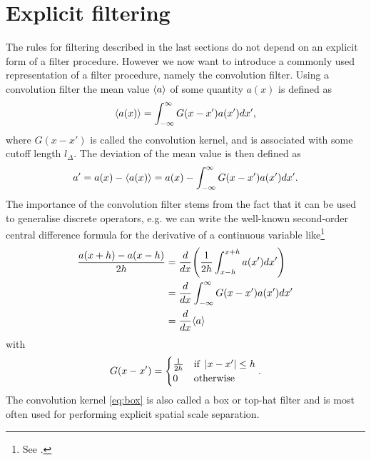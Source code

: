 \section{Explicit filtering}\label{expfil}
The rules for filtering described in the last sections do not depend on an
explicit form of a filter procedure. However we now want to introduce
a commonly used representation of a filter procedure, namely the convolution
filter. Using a convolution filter the mean value $\langle a \rangle$ of some
quantity $a(x)$ is defined as 
\begin{align}
\langle a(x) \rangle = \int_{-\infty}^{\infty} G(x-x') a(x') dx', 
\end{align}
where $G(x-x')$ is called the convolution kernel, and is associated with
some cutoff length $l_{\Delta}$. The deviation of the mean value is then
defined as
\begin{align}
a' = a(x) - \langle a(x) \rangle = a(x) - \int_{-\infty}^{\infty} G(x-x') a(x') dx'.
\end{align}
The importance of the convolution filter stems from the fact that it can be
used to generalise discrete operators, e.g. we can write the well-known
second-order central difference formula for the derivative of a continuous
variable like\footnote{See \citet{Rogallo1984}.}
\begin{align*}
\frac{a(x+h)-a(x-h)}{2h}&=\frac{d}{d x}{ \left( \frac{1}{2h}\int_{x-h}^{x+h} a(x') dx' \right) }\\
&= \frac{d}{d x} \int_{-\infty}^{\infty} G(x-x') a(x') dx'\\
&= \frac{d}{d x} \langle a \rangle
\end{align*}
with 
\begin{align}
G(x-x') = 
\begin{cases}
\frac{1}{2h} & \text{if }\left\lvert x-x'\right\rvert \leq h \\
0 & \text{otherwise}
\end{cases}.\label{eq:box}
\end{align}
The convolution kernel \eqref{eq:box} is also called a box or top-hat filter and
is most often used for performing explicit spatial scale separation. 
   